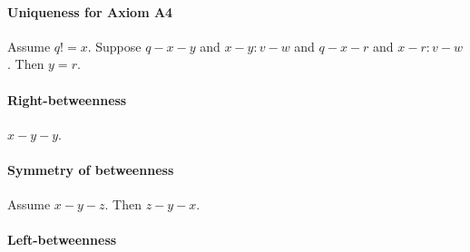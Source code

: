 \documentclass{article}
\begin{document}
  \paragraph{Uniqueness for Axiom A4}

  \begin{forthel}
    \begin{lemma}[L2_12]
      Assume $q != x$. Suppose $q-x-y$ and $x-y : v-w$ and $q-x-r$ and $x-r : v-w$. Then $y = r$.
    \end{lemma}
  \end{forthel}


  \paragraph{Right-betweenness}

  \begin{forthel}
    \begin{lemma}[L3_1]
      $x-y-y$.
    \end{lemma}
  \end{forthel}


  \paragraph{Symmetry of betweenness}

  \begin{forthel}
    \begin{lemma}[L3_2]
      Assume $x-y-z$. Then $z-y-x$.
    \end{lemma}
  \end{forthel}


  \paragraph{Left-betweenness}
\end{document}
